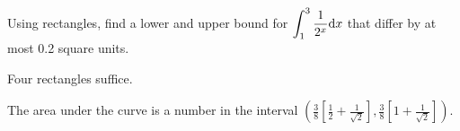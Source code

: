 \begin{question}
Using rectangles, find a lower and upper bound for $\displaystyle\int_1^3 \dfrac{1}{2^x}\mathrm{d}x$ that differ by at most 0.2 square units.
\begin{center}
\end{center}
\end{question}
\begin{hint}
Four rectangles suffice.
\end{hint}
\begin{answer}
The area under the curve is a number in the interval $\left( \frac{3}{8}\left[\frac{1}{2}+\frac{1}{\sqrt{2}}\right], \frac{3}{8}\left[1+\frac{1}{\sqrt{2}}\right]\right)$.
\end{answer}
